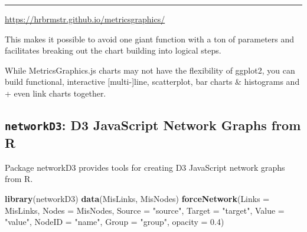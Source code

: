 \documentclass[]{book}
\newenvironment{Shaded}{\begin{snugshade}}{\end{snugshade}}
\newcommand{\KeywordTok}[1]{\textcolor[rgb]{0.13,0.29,0.53}{\textbf{{#1}}}}
\newcommand{\DataTypeTok}[1]{\textcolor[rgb]{0.13,0.29,0.53}{{#1}}}
\newcommand{\DecValTok}[1]{\textcolor[rgb]{0.00,0.00,0.81}{{#1}}}
\newcommand{\FloatTok}[1]{\textcolor[rgb]{0.00,0.00,0.81}{{#1}}}
\newcommand{\StringTok}[1]{\textcolor[rgb]{0.31,0.60,0.02}{{#1}}}
\newcommand{\NormalTok}[1]{{#1}}
\theoremstyle{definition}
\theoremstyle{definition}
\theoremstyle{remark}
\begin{document}
\begin{Shaded}
\end{Shaded}

\hypertarget{mjs-5e1bc4ef1675ae2f13df0db6753139}{}

\hypertarget{mjs-5e1bc4ef1675ae2f13df0db6753139-legend}{}

\begin{center}\rule{0.5\linewidth}{\linethickness}\end{center}

\url{https://hrbrmstr.github.io/metricsgraphics/}

This makes it possible to avoid one giant function with a ton of
parameters and facilitates breaking out the chart building into logical
steps.

While MetricsGraphics.js charts may not have the flexibility of ggplot2,
you can build functional, interactive {[}multi-{]}line, scatterplot, bar
charts \& histograms and + even link charts together.

\subsection{\texorpdfstring{\texttt{networkD3}: D3 JavaScript Network
Graphs from
R}{networkD3: D3 JavaScript Network Graphs from R}}\label{networkd3-d3-javascript-network-graphs-from-r}

Package networkD3 provides tools for creating D3 JavaScript network
graphs from R.

\begin{Shaded}
\begin{Highlighting}[]
\KeywordTok{library}\NormalTok{(networkD3)}
\KeywordTok{data}\NormalTok{(MisLinks, MisNodes)}
\KeywordTok{forceNetwork}\NormalTok{(}\DataTypeTok{Links =} \NormalTok{MisLinks, }\DataTypeTok{Nodes =} \NormalTok{MisNodes, }\DataTypeTok{Source =} \StringTok{"source"}\NormalTok{,}
             \DataTypeTok{Target =} \StringTok{"target"}\NormalTok{, }\DataTypeTok{Value =} \StringTok{"value"}\NormalTok{, }\DataTypeTok{NodeID =} \StringTok{"name"}\NormalTok{,}
             \DataTypeTok{Group =} \StringTok{"group"}\NormalTok{, }\DataTypeTok{opacity =} \FloatTok{0.4}\NormalTok{)}
\end{Highlighting}
\end{Shaded}
\end{document}
